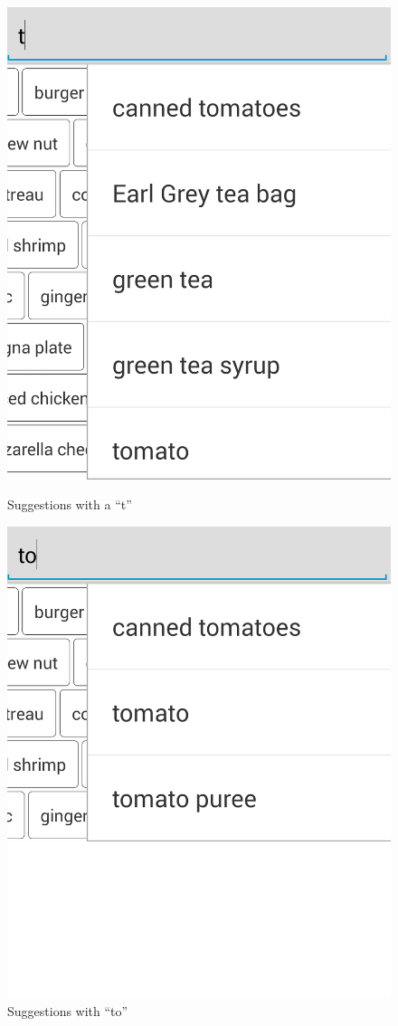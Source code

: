 \begin{figure}[H]
\begin{minipage}[b]{0.5\columnwidth}
\centering
\includegraphics[width=0.7\columnwidth]{img/screenshots/searchSuggestion1.png}
\caption{Suggestions with a ``t''\label{fig:suggestt}}
\end{minipage}
\hspace{0.5cm}
\begin{minipage}[b]{0.5\columnwidth}
\centering
\includegraphics[width=0.7\columnwidth]{img/screenshots/searchSuggestion2.png}
\caption{Suggestions with ``to''\label{fig:suggestto}}
\end{minipage}
\end{figure}

